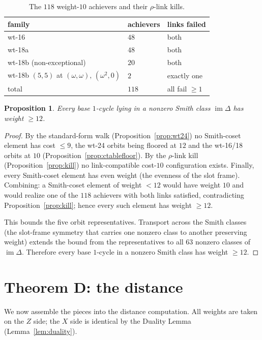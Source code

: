 \documentclass[11pt]{article}
\DeclareMathOperator{\img}{im}
\newcommand{\cmap}{\Delta}                       %
\theoremstyle{plain}
\newtheorem{proposition}[lemma]{Proposition}
\theoremstyle{definition}
\theoremstyle{remark}
\begin{document}
\begin{table}[h]
\centering
\caption{The $118$ weight-$10$ achievers and their $\rho$-link kills.}
\label{tab:kills}
\begin{tabular}{lll}
\toprule
family & achievers & links failed\\
\midrule
wt-16   & $48$ & both\\
wt-18a  & $48$ & both\\
wt-18b (non-exceptional) & $20$ & both\\
wt-18b $(5,5)$ at $(\omega,\omega),\,(\omega^2,0)$ & $2$  & exactly one\\
\midrule
total & $118$ & all fail $\ge 1$\\
\bottomrule
\end{tabular}
\end{table}

\begin{proposition}\label{thm:Mim}
Every base $1$-cycle lying in a nonzero Smith class $\img\cmap$ has weight $\ge 12$.
\end{proposition}

\begin{proof}
By the standard-form walk (Proposition~\ref{prop:wt24}) no Smith-coset element has cost
$\le 9$, the wt-24 orbits being floored at $12$ and the wt-16/18 orbits at $10$
(Proposition~\ref{prop:ctablefloor}). By the $\rho$-link kill (Proposition~\ref{prop:kill}) no
link-compatible cost-$10$ configuration exists. Finally, every Smith-coset element has even
weight (the evenness of the slot frame). Combining: a Smith-coset element of weight $<12$ would
have weight $10$ and would realize one of the $118$ achievers with both links satisfied,
contradicting Proposition~\ref{prop:kill}; hence every such element has weight $\ge 12$.

This bounds the five orbit representatives. Transport across the Smith classes (the slot-frame
symmetry that carries one nonzero class to another preserving weight) extends the bound from
the representatives to all $63$ nonzero classes of $\img\cmap$. Therefore every base $1$-cycle
in a nonzero Smith class has weight $\ge 12$.
\end{proof}
\section{Theorem D: the distance}\label{sec:thmD}

We now assemble the pieces into the distance computation. All weights are taken on
the $Z$ side; the $X$ side is identical by the Duality Lemma (Lemma~\ref{lem:duality}).
\end{document}
